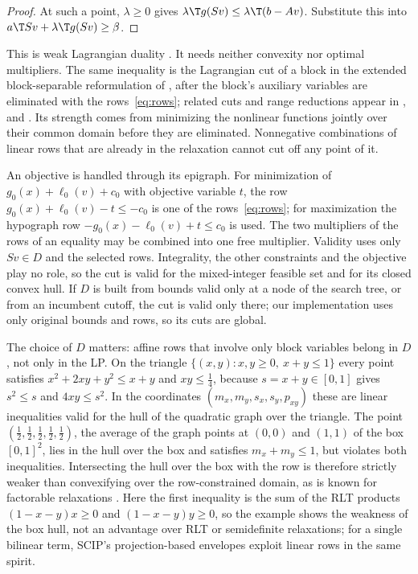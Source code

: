 \begin{proof}
At such a point, $\lambda\ge0$ gives $\lambda\T g(Sv)\le\lambda\T(b-Av)$.
Substitute this into $a\T Sv+\lambda\T g(Sv)\ge\beta$.
\end{proof}

This is weak Lagrangian duality
\citep[Sections~5.1.3 and~5.2.2]{BoydVandenberghe2004}. It needs neither
convexity nor optimal multipliers. The same inequality is the Lagrangian
cut of a block in the extended block-separable reformulation of
\citet[Section~7.1]{Nowak2005}, after the block's auxiliary variables are
eliminated with the rows~\eqref{eq:rows}; related cuts and range reductions
appear in \citet{TawarmalaniSahinidis2004}, \citet{KaruppiahGrossmann2008}
and \citet{DomesNeumaier2016}. Its strength comes from minimizing the
nonlinear functions jointly over their common domain before they are
eliminated. Nonnegative combinations of linear rows that are already in the
relaxation cannot cut off any point of it.

An objective is handled through its epigraph. For minimization of
$g_0(x)+\ell_0(v)+c_0$ with objective variable $t$, the row
$g_0(x)+\ell_0(v)-t\le-c_0$ is one of the rows~\eqref{eq:rows}; for
maximization the hypograph row $-g_0(x)-\ell_0(v)+t\le c_0$ is used. The two
multipliers of the rows of an equality may be combined into one free
multiplier. Validity uses only $Sv\in D$ and the selected rows. Integrality,
the other constraints and the objective play no role, so the cut is valid
for the mixed-integer feasible set and for its closed convex hull. If $D$ is
built from bounds valid only at a node of the search tree, or from an
incumbent cutoff, the cut is valid only there; our implementation uses only
original bounds and rows, so its cuts are global.

The choice of $D$ matters: affine rows that involve only block variables
belong in $D$, not only in the LP. On the triangle $\{(x,y):x,y\ge0,\ x+y\le1\}$
every point satisfies $x^2+2xy+y^2\le x+y$ and $xy\le\tfrac14$, because
$s=x+y\in[0,1]$ gives $s^2\le s$ and $4xy\le s^2$. In the coordinates
$(m_x,m_y,s_x,s_y,p_{xy})$ these are linear inequalities valid for the hull
of the quadratic graph over the triangle. The point
$(\tfrac12,\tfrac12,\tfrac12,\tfrac12,\tfrac12)$, the average of the graph points
at $(0,0)$ and $(1,1)$ of the box $[0,1]^2$, lies in the hull over the box and
satisfies $m_x+m_y\le1$, but violates both inequalities. Intersecting the
hull over the box with the row is therefore strictly weaker than
convexifying over the row-constrained domain, as is known for factorable
relaxations \citep{Anstreicher2012,ZhuHeTawarmalani2026,WuMutsNowakHendrix2025}.
Here the first inequality is the sum of the RLT products $(1-x-y)x\ge0$ and
$(1-x-y)y\ge0$, so the example shows the weakness of the box hull, not an
advantage over RLT or semidefinite relaxations; for a single bilinear term,
SCIP's projection-based envelopes \citep{MullerSerranoGleixner2020} exploit
linear rows in the same spirit.

